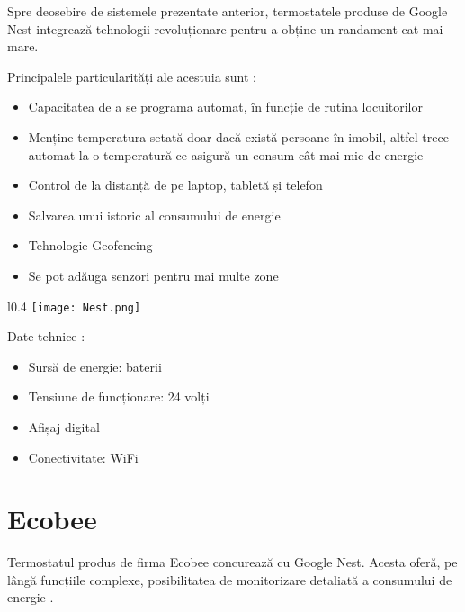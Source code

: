 	Spre deosebire de sistemele prezentate anterior, termostatele produse de Google Nest integrează tehnologii revoluționare pentru a obține un randament cat mai mare.

\vspace{2em}

	Principalele particularități ale acestuia sunt \cite{nest}:
	\begin{itemize}
	\setlength{\itemindent}{2em}
		\itemsep0em
		\item Capacitatea de a se programa automat, în funcție de rutina locuitorilor
		\item Menține temperatura setată doar dacă există persoane în imobil, altfel trece automat la o temperatură ce asigură un consum cât mai mic de energie
		\item Control de la distanță de pe laptop, tabletă și telefon
		\item Salvarea unui istoric al consumului de energie
		\item Tehnologie Geofencing
		\item Se pot adăuga senzori pentru mai multe zone
	\end{itemize}

\vspace{1em}

\begin{wrapfigure}[5]{l}{0.4\textwidth}
\centering
\texttt{[image: Nest.png]}
\end{wrapfigure}

	Date tehnice \cite{nest}:
	\begin{itemize}
	\setlength{\itemindent}{2em}
		\itemsep0em
		\item Sursă de energie: baterii
		\item Tensiune de funcționare: 24 volți
		\item Afișaj digital
		\item Conectivitate: WiFi
	\end{itemize}

\vspace{3em}


\section{Ecobee}
	 Termostatul produs de firma Ecobee concurează cu Google Nest. Acesta oferă, pe lângă funcțiile complexe, posibilitatea de monitorizare detaliată a consumului de energie \cite{ecobee}.
	
\vspace{2em}

